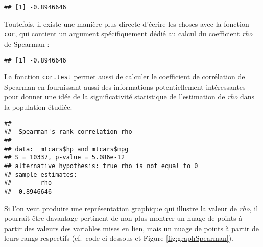 \documentclass[
]{book}
\newenvironment{Shaded}{\begin{snugshade}}{\end{snugshade}}
\newcommand{\AttributeTok}[1]{\textcolor[rgb]{0.77,0.63,0.00}{#1}}
\newcommand{\FunctionTok}[1]{\textcolor[rgb]{0.00,0.00,0.00}{#1}}
\newcommand{\NormalTok}[1]{#1}
\newcommand{\SpecialCharTok}[1]{\textcolor[rgb]{0.00,0.00,0.00}{#1}}
\newcommand{\StringTok}[1]{\textcolor[rgb]{0.31,0.60,0.02}{#1}}
\begin{document}
\begin{verbatim}
## [1] -0.8946646
\end{verbatim}

Toutefois, il existe une manière plus directe d'écrire les choses avec la fonction \texttt{cor}, qui contient un argument spécifiquement dédié au calcul du coefficient \emph{rho} de Spearman :

\begin{Shaded}
\end{Shaded}

\begin{verbatim}
## [1] -0.8946646
\end{verbatim}

La fonction \texttt{cor.test} permet aussi de calculer le coefficient de corrélation de Spearman en fournissant aussi des informations potentiellement intéressantes pour donner une idée de la significativité statistique de l'estimation de \emph{rho} dans la population étudiée.

\begin{Shaded}
\end{Shaded}

\begin{verbatim}
## 
##  Spearman's rank correlation rho
## 
## data:  mtcars$hp and mtcars$mpg
## S = 10337, p-value = 5.086e-12
## alternative hypothesis: true rho is not equal to 0
## sample estimates:
##        rho 
## -0.8946646
\end{verbatim}

Si l'on veut produire une représentation graphique qui illustre la valeur de \emph{rho}, il pourrait être davantage pertinent de non plus montrer un nuage de points à partir des valeurs des variables mises en lien, mais un nuage de points à partir de leurs rangs respectifs (cf.~code ci-dessous et Figure \ref{fig:graphSpearman}).
\end{document}
